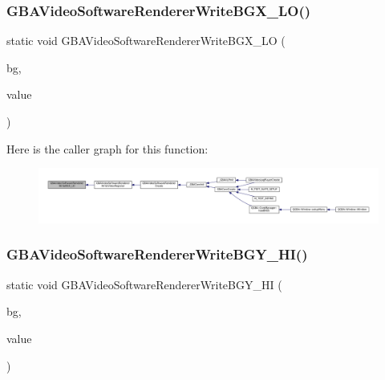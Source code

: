 \subsubsection{\texorpdfstring{G\+B\+A\+Video\+Software\+Renderer\+Write\+B\+G\+X\+\_\+\+L\+O()}{GBAVideoSoftwareRendererWriteBGX\_LO()}}
{\footnotesize\ttfamily static void G\+B\+A\+Video\+Software\+Renderer\+Write\+B\+G\+X\+\_\+\+LO (\begin{DoxyParamCaption}\item[{struct G\+B\+A\+Video\+Software\+Background $\ast$}]{bg,  }\item[{uint16\+\_\+t}]{value }\end{DoxyParamCaption})\hspace{0.3cm}{\ttfamily [static]}}

Here is the caller graph for this function\+:
\nopagebreak
\begin{figure}[H]
\begin{center}
\leavevmode
\includegraphics[width=350pt]{video-software_8c_abe569d881e965273d28bf508dcf8bf02_icgraph}
\end{center}
\end{figure}
\mbox{\label{video-software_8c_ab554a768bf9f03c8ca9b30c56f50809d}} 
\subsubsection{\texorpdfstring{G\+B\+A\+Video\+Software\+Renderer\+Write\+B\+G\+Y\+\_\+\+H\+I()}{GBAVideoSoftwareRendererWriteBGY\_HI()}}
{\footnotesize\ttfamily static void G\+B\+A\+Video\+Software\+Renderer\+Write\+B\+G\+Y\+\_\+\+HI (\begin{DoxyParamCaption}\item[{struct G\+B\+A\+Video\+Software\+Background $\ast$}]{bg,  }\item[{uint16\+\_\+t}]{value }\end{DoxyParamCaption})\hspace{0.3cm}{\ttfamily [static]}}

